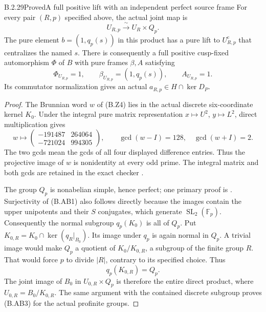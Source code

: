\begin{result}{B.2.29}{Proved}{A full positive lift with an independent perfect source frame}
For every pair $(R,p)$ specified above, the actual joint map is
\[
 U_{R,p}\xrightarrow{\ \sim\ }U_R\times Q_p.
 \tag{B.AB3}
\]
The pure element $b=(1,q_p(s))$ in this product has a
pure lift to $U_{R,p}^{\mathrm c}$ that centralizes the
named $s$.  There is consequently a full positive
cusp-fixed automorphism $\Phi$ of $B$ with pure frames
$\beta,A$ satisfying
\[
 \Phi_{U_{R,p}}=1,\qquad
 \beta_{U_{R,p}}=(1,q_p(s)),\qquad A_{U_{R,p}}=1.
 \tag{B.AB4}
\]
Its commutator normalization gives an actual
$a_{R,p}\in H\cap\ker D_P$.
\end{result}
\begin{proof}
The Brunnian word $w$ of (B.Z4) lies in the actual
discrete six-coordinate kernel $K_0$.  Under the integral
pure matrix representation $x\mapsto U^2$,
$y\mapsto L^2$, direct multiplication gives
\[
 w\longmapsto
 \begin{pmatrix}-191487&264064\\-721024&994305\end{pmatrix},
 \qquad
 \gcd(w-I)=128,\quad\gcd(w+I)=2.
 \tag{B.AB5}
\]
The two gcds mean the gcds of all four displayed
difference entries.  Thus the projective image of $w$
is nonidentity at every odd prime.  The integral matrix
and both gcds are retained in the exact checker
.

The group $Q_p$ is nonabelian simple, hence perfect;
one primary proof is \cite[Theorems 3.3--3.5]{CA_ConradPSL}.
Surjectivity of (B.AB1) also follows directly because
the images contain the upper unipotents and their
$S$ conjugates, which generate $\operatorname{SL}_2(\mathbb F_p)$.
Consequently the normal subgroup $q_p(K_0)$ is all
of $Q_p$.  Put $K_{0,R}=K_0\cap\ker(q_R|_{B_0})$.
Its image under $q_p$ is again normal in $Q_p$.
A trivial image would make $Q_p$ a quotient of
$K_0/K_{0,R}$, a subgroup of the finite group $R$.
That would force $p$ to divide $|R|$, contrary to its
specified choice.  Thus
\[
                         q_p(K_{0,R})=Q_p.
 \tag{B.AB6}
\]
The joint image of $B_0$ in $U_{0,R}\times Q_p$ is
therefore the entire direct product, where
$U_{0,R}=B_0/K_{0,R}$.  The same argument with the
contained discrete subgroup proves (B.AB3) for the
actual profinite groups.


\end{proof}
